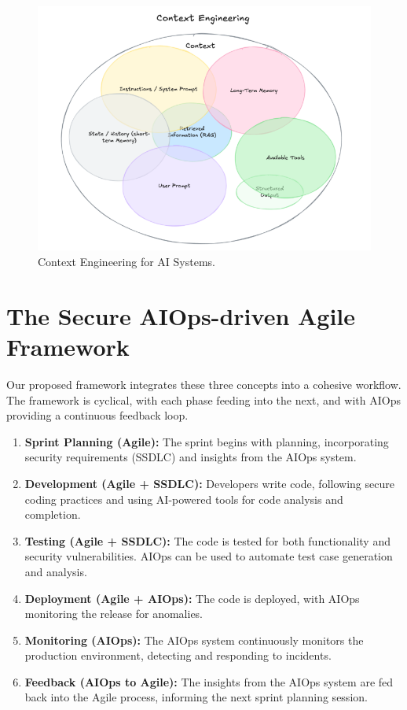 \documentclass[journal]{IEEEtran}
\begin{document}
\begin{figure}[h]
    \centering
    \includegraphics[width=0.8\columnwidth]{image 3.png}
    \caption{Context Engineering for AI Systems.}
    \label{fig:context_engineering}
\end{figure}

\section{The Secure AIOps-driven Agile Framework}
Our proposed framework integrates these three concepts into a cohesive workflow. The framework is cyclical, with each phase feeding into the next, and with AIOps providing a continuous feedback loop.

\begin{enumerate}
    \item \textbf{Sprint Planning (Agile):} The sprint begins with planning, incorporating security requirements (SSDLC) and insights from the AIOps system.
    \item \textbf{Development (Agile + SSDLC):} Developers write code, following secure coding practices and using AI-powered tools for code analysis and completion.
    \item \textbf{Testing (Agile + SSDLC):} The code is tested for both functionality and security vulnerabilities. AIOps can be used to automate test case generation and analysis.
    \item \textbf{Deployment (Agile + AIOps):} The code is deployed, with AIOps monitoring the release for anomalies.
    \item \textbf{Monitoring (AIOps):} The AIOps system continuously monitors the production environment, detecting and responding to incidents.
    \item \textbf{Feedback (AIOps to Agile):} The insights from the AIOps system are fed back into the Agile process, informing the next sprint planning session.
\end{enumerate}
\end{document}
